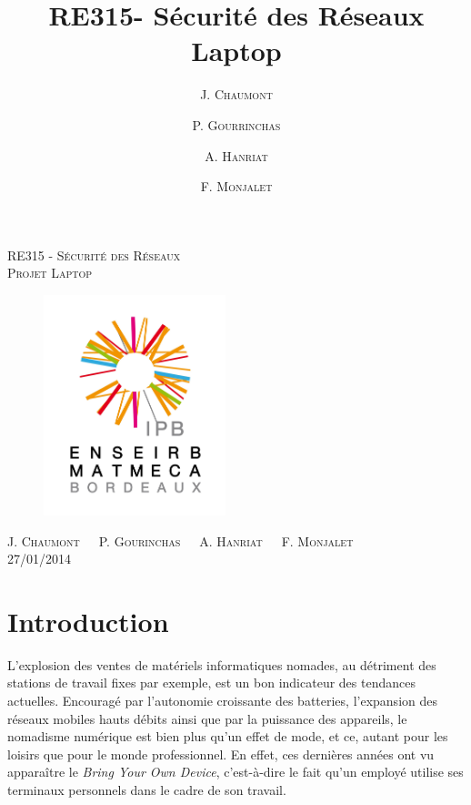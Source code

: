 \documentclass[12pt,a4paper]{article}
\author{J. \textsc{Chaumont} \and P. \textsc{Gourrinchas} \and \textsc{A. Hanriat} \and \textsc{F. Monjalet}}
\title{RE315- Sécurité des Réseaux\\Laptop}
\begin{document}
\thispagestyle{empty}
\begin{center}

\LARGE{\textsc{RE315 - Sécurité des Réseaux}}\\[0.8cm]
\Large{\textsc{Projet Laptop}}

\vspace*{0.5cm}

\begin{figure}[H]
	\begin{center}
		\includegraphics[width=200px]{img/logo.jpg}
	\end{center}
\end{figure}

\vspace*{0.3cm}
\Large{J. \textsc{Chaumont}\ \ \ P. \textsc{Gourinchas}\ \ \ \textsc{A. Hanriat}\ \ \ \textsc{F. Monjalet}}\\
\vspace*{1cm}
\large{27/01/2014}



\end{center}

\clearpage
\tableofcontents
\clearpage


\section*{Introduction}

L'explosion des ventes de matériels informatiques nomades, au détriment des stations de travail fixes par exemple, est un bon indicateur des tendances actuelles. Encouragé par l'autonomie croissante des batteries, l'expansion des réseaux mobiles hauts débits ainsi que par la puissance des appareils, le nomadisme numérique est bien plus qu'un effet de mode, et ce, autant pour les loisirs que pour le monde professionnel. En effet, ces dernières années ont vu apparaître le \textit{Bring Your Own Device}, c'est-à-dire le fait qu'un employé utilise ses terminaux personnels dans le cadre de son travail.
\end{document}
